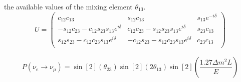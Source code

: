 \documentclass[letter,12pt]{article}
\begin{document}
the available values of the mixing element $\theta_{13}$.
\begin{equation}
	U=
	\begin{pmatrix}
		c_{12}c_{13} & s_{12}c_{13} & s_{13}e^{-i\delta}\\
		-s_{12}c_{23} -c_{12}s_{23}s_{13}e^{i\delta} & c_{12}c_{23} -s_{12}s_{23}s_{13}e^{i\delta} & s_{23}c_{13}\\
		s_{12}s_{23} -c_{12}c_{23}s_{13}e^{i\delta} & -c_{12}s_{23} -s_{12}c_{23}s_{13}e^{i\delta} & c_{23}c_{13}\\
	\end{pmatrix}
\end{equation}

\begin{equation}
	\begin{aligned}
		P(\nu_e \rightarrow \nu_\mu) = \sin[2](\theta_{23})\sin[2](2\theta_{13})
		\sin[2](\dfrac{1.27\Delta m^2L}{E})
	\end{aligned}
\end{equation}



\end{document}
